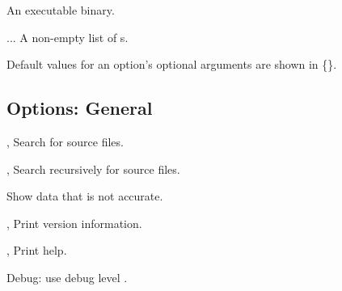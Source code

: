 \documentclass[english]{article}
\begin{document}
\begin{Description}
\item[\Arg{binary}] An executable binary.
\item[\Arg{hpcrun-file}...] A non-empty list of s.
\end{Description}

Default values for an option's optional arguments are shown in \{\}.

\subsection{Options: General}

\begin{Description}
\item[\OptArg{-d}{dir}, \OptArg{--directory}{dir}] Search  for source files.
\item[\OptArg{-D}{dir}, \OptArg{--recursive-directory}{dir}] Search  recursively for source files.
\item[\Opt{--force}] Show data that is not accurate.
\item[\Opt{-V}, \Opt{--version}] Print version information.
\item[\Opt{-h}, \Opt{--help}] Print help.
\item[\OptArg{--debug}{n}]   Debug: use debug level .
\end{Description}
\end{document}
